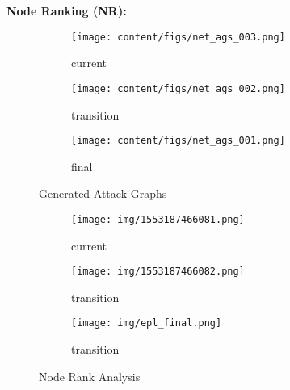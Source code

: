 
\textbf{Node Ranking (NR):  }

\begin{figure}[H]
\centering
\begin{adjustbox}{minipage=\linewidth,scale=0.6}
\begin{subfigure}{.33\textwidth}
\texttt{[image: content/figs/net\_ags\_003.png]}
\caption{current}
\label{fig:ag_currt}
\end{subfigure}%
\begin{subfigure}{.33\textwidth}
\texttt{[image: content/figs/net\_ags\_002.png]}
\caption{transition}
\label{fig:ag_trans}
\end{subfigure}%
\begin{subfigure}{.2\textwidth}
\texttt{[image: content/figs/net\_ags\_001.png]}
\caption{final}
\label{fig:ag_fut}
\end{subfigure}%
\caption{Generated Attack Graphs}
\end{adjustbox}
\end{figure} 


\begin{figure}[H]
\centering
\begin{adjustbox}{minipage=\linewidth,scale=0.6}
\begin{subfigure}{.33\textwidth}
\texttt{[image: img/1553187466081.png]}
\caption{current}
\label{fig:nra_curr}
\end{subfigure}%
\begin{subfigure}{.33\textwidth}
\texttt{[image: img/1553187466082.png]}
\caption{transition}
\label{fig:nra_trans}
\end{subfigure}%
\begin{subfigure}{.33\textwidth}
\texttt{[image: img/epl\_final.png]}
\caption{transition}
\label{fig:nra_fin}
\end{subfigure}%
\caption{Node Rank Analysis}
\end{adjustbox}
\end{figure} 